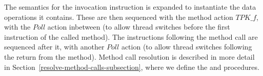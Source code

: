 The semantics for the invocation instruction is expanded to
instantiate the data operations it contains.
These are then sequenced with the method action $TPK\_f$, with the
$Poll$ action inbetween (to allow thread switches before the first
instruction of the called method).
The instructions following the method call are sequenced after it,
with another $Poll$ action (to allow thread switches following the
return from the method).
Method call resolution is described in more detail in
Section~\ref{resolve-method-calls-subsection}, where we define the
 and 
procedures.

